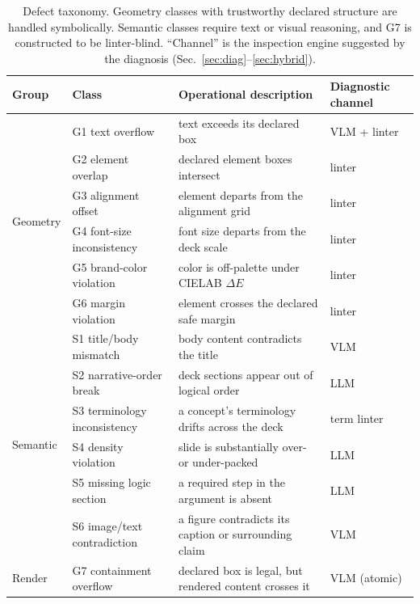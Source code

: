 \documentclass[letterpaper]{article}            %
\newcommand{\g}[1]{\textsf{#1}}        %
\begin{document}
\begin{table}[t]
\centering
\small
\caption{Defect taxonomy. Geometry classes with trustworthy declared structure are handled symbolically.
Semantic classes require text or visual reasoning, and \g{G7} is constructed to be linter-blind. ``Channel'' is
the inspection engine suggested by the diagnosis (Sec.~\ref{sec:diag}--\ref{sec:hybrid}).}
\label{tab:taxonomy}
\setlength{\tabcolsep}{7pt}
\renewcommand{\arraystretch}{1.08}
\begin{tabular}{@{}p{}p{}p{}p{}@{}}
\toprule
Group & Class & Operational description & Diagnostic channel \\
\midrule
\multirow{6}{*}{Geometry} & \g{G1} text overflow & text exceeds its declared box & VLM + linter \\
 & \g{G2} element overlap & declared element boxes intersect & linter \\
 & \g{G3} alignment offset & element departs from the alignment grid & linter \\
 & \g{G4} font-size inconsistency & font size departs from the deck scale & linter \\
 & \g{G5} brand-color violation & color is off-palette under CIELAB $\Delta E$ & linter \\
 & \g{G6} margin violation & element crosses the declared safe margin & linter \\
\midrule
\multirow{6}{*}{Semantic} & \g{S1} title/body mismatch & body content contradicts the title & VLM \\
 & \g{S2} narrative-order break & deck sections appear out of logical order & LLM \\
 & \g{S3} terminology inconsistency & a concept's terminology drifts across the deck & term linter \\
 & \g{S4} density violation & slide is substantially over- or under-packed & LLM \\
 & \g{S5} missing logic section & a required step in the argument is absent & LLM \\
 & \g{S6} image/text contradiction & a figure contradicts its caption or surrounding claim & VLM \\
\midrule
Render & \g{G7} containment overflow & declared box is legal, but rendered content crosses it & VLM (atomic) \\
\bottomrule
\end{tabular}
\end{table}
\end{document}
